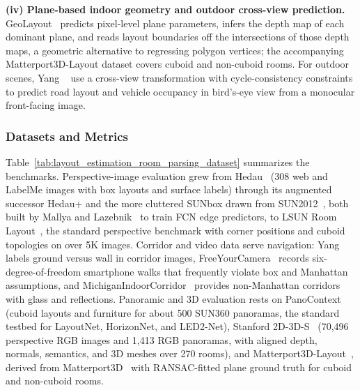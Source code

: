 \textbf{(iv) Plane-based indoor geometry and outdoor cross-view prediction.}
GeoLayout~\cite{0005ZZ20} predicts pixel-level plane parameters, infers the depth map of each dominant plane, and reads layout boundaries off the intersections of those depth maps, a geometric alternative to regressing polygon vertices; the accompanying Matterport3D-Layout dataset covers cuboid and non-cuboid rooms. For outdoor scenes, Yang \etal~\cite{YangLLYMHP21} use a cross-view transformation with cycle-consistency constraints to predict road layout and vehicle occupancy in bird's-eye view from a monocular front-facing image.

\subsubsection{Datasets and Metrics}
Table~\ref{tab:layout_estimation_room_parsing_dataset} summarizes the benchmarks. Perspective-image evaluation grew from Hedau~\cite{HedauHF09} (308 web and LabelMe images with box layouts and surface labels) through its augmented successor Hedau+ and the more cluttered SUNbox drawn from SUN2012~\cite{XiaoHEOT10}, both built by Mallya and Lazebnik~\cite{MallyaL15} to train FCN edge predictors, to LSUN Room Layout~\cite{yu2015lsun}, the standard perspective benchmark with corner positions and cuboid topologies on over 5K images. Corridor and video data serve navigation: Yang~\cite{YangMS16} labels ground versus wall in corridor images, FreeYourCamera~\cite{FurlanMSLS13} records six-degree-of-freedom smartphone walks that frequently violate box and Manhattan assumptions, and MichiganIndoorCorridor~\cite{TsaiXLK11} provides non-Manhattan corridors with glass and reflections. Panoramic and 3D evaluation rests on PanoContext~\cite{zhang2014panocontext} (cuboid layouts and furniture for about 500 SUN360 panoramas, the standard testbed for LayoutNet, HorizonNet, and LED2-Net), Stanford 2D-3D-S~\cite{armeni2017joint} (70,496 perspective RGB images and 1,413 RGB panoramas, with aligned depth, normals, semantics, and 3D meshes over 270 rooms), and Matterport3D-Layout~\cite{0005ZZ20}, derived from Matterport3D~\cite{chang2017matterport3d} with RANSAC-fitted plane ground truth for cuboid and non-cuboid rooms.


